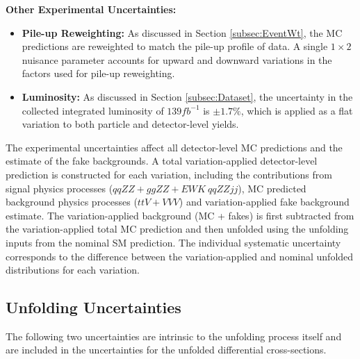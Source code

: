 \textbf{Other Experimental Uncertainties: }
\begin{itemize}
    \item{\textbf{Pile-up Reweighting:} As discussed in Section \ref{subsec:EventWt}, the MC predictions are reweighted to match the pile-up profile of data. A single $1\times2$ nuisance parameter accounts for upward and downward variations in the factors used for pile-up reweighting. }
    \item{\textbf{Luminosity:} As discussed in Section \ref{subsec:Dataset}, the uncertainty in the collected integrated luminosity of $139 fb^{-1}$ is $\pm1.7\%$, which is applied as a flat variation to both particle and detector-level yields. } 
\end{itemize}

The experimental uncertainties affect all detector-level MC predictions and the estimate of the fake backgrounds. A total variation-applied detector-level prediction is constructed for each variation, including the contributions from signal physics processes ($qqZZ+ggZZ+EWK~qqZZjj$), MC predicted background physics processes ($ttV+VVV$) and variation-applied fake background estimate. The variation-applied background (MC + fakes) is first subtracted from the variation-applied total MC prediction and then unfolded using the unfolding inputs from the nominal SM prediction. The individual systematic uncertainty corresponds to the difference between the variation-applied and nominal unfolded distributions for each variation.  

\subsection{Unfolding Uncertainties}
\label{subsec:UnfoldingUnc}
The following two uncertainties are intrinsic to the unfolding process itself and are included in the uncertainties for the unfolded differential cross-sections.

